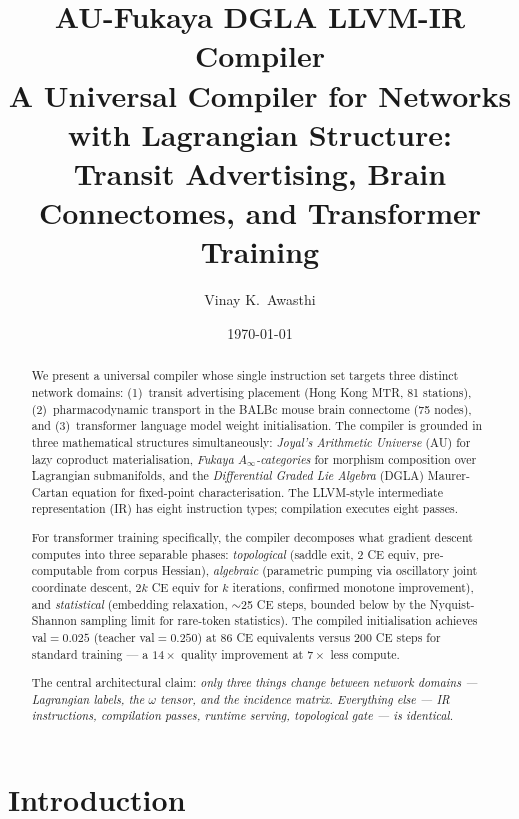 \documentclass[11pt]{amsart}
\title{%
  \textbf{AU-Fukaya DGLA LLVM-IR Compiler}\\[6pt]
  \large A Universal Compiler for Networks with Lagrangian Structure:\\
  Transit Advertising, Brain Connectomes, and Transformer Training
}
\author{Vinay K.\ Awasthi}
\date{\today}
\begin{document}
\maketitle

\begin{abstract}
We present a universal compiler whose single instruction set targets
three distinct network domains: (1)~transit advertising placement
(Hong Kong MTR, 81 stations), (2)~pharmacodynamic transport in the
BALBc mouse brain connectome (75 nodes), and (3)~transformer language
model weight initialisation.
The compiler is grounded in three mathematical structures simultaneously:
\emph{Joyal's Arithmetic Universe} (AU) for lazy coproduct materialisation,
\emph{Fukaya $A_\infty$-categories} for morphism composition over
Lagrangian submanifolds, and the \emph{Differential Graded Lie Algebra}
(DGLA) Maurer-Cartan equation for fixed-point characterisation.
The LLVM-style intermediate representation (IR) has eight instruction
types; compilation executes eight passes.

For transformer training specifically, the compiler decomposes
what gradient descent computes into three separable phases:
\emph{topological} (saddle exit, 2 CE equiv, pre-computable from
corpus Hessian), \emph{algebraic} (parametric pumping via oscillatory
joint coordinate descent, $2k$ CE equiv for $k$ iterations, confirmed
monotone improvement), and \emph{statistical} (embedding relaxation,
$\sim$25 CE steps, bounded below by the Nyquist-Shannon sampling limit
for rare-token statistics).
The compiled initialisation achieves val${=}0.025$ (teacher val${=}0.250$)
at 86 CE equivalents versus 200 CE steps for standard training ---
a $14{\times}$ quality improvement at $7{\times}$ less compute.

The central architectural claim:
\emph{only three things change between network domains ---
Lagrangian labels, the $\omega$ tensor, and the incidence matrix.
Everything else --- IR instructions, compilation passes, runtime
serving, topological gate --- is identical.}
\end{abstract}

\tableofcontents

\section{Introduction}
\end{document}
